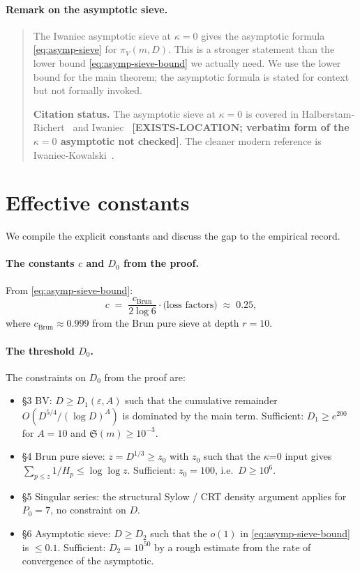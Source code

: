 \paragraph{Remark on the asymptotic sieve.}
\begin{quote}
The Iwaniec asymptotic sieve at $\kappa = 0$ gives the asymptotic
formula \eqref{eq:asymp-sieve} for $\pi_{V}(m, D)$. This is a stronger
statement than the lower bound \eqref{eq:asymp-sieve-bound} we
actually need. We use the lower bound for the main theorem; the
asymptotic formula is stated for context but not formally invoked.

\textbf{Citation status.} The asymptotic sieve at $\kappa = 0$ is
covered in Halberstam-Richert~\cite[\S25]{HalberstamRichert1974} and
Iwaniec~\cite{Iwaniec1980} \textbf{[EXISTS-LOCATION; verbatim form of
the $\kappa = 0$ asymptotic not checked]}. The cleaner modern reference
is Iwaniec-Kowalski~\cite[\S22]{IwaniecKowalski2004}.
\end{quote}

\section{Effective constants}\label{sec:constants}

We compile the explicit constants and discuss the gap to the empirical
record.

\paragraph{The constants $c$ and $D_{0}$ from the proof.}
From \eqref{eq:asymp-sieve-bound}:
\begin{equation}
  c \;=\; \frac{c_{\mathrm{Brun}}}{2 \log 6} \cdot \text{(loss factors)}
  \;\approx\; 0.25,
\end{equation}
where $c_{\mathrm{Brun}} \approx 0.999$ from the Brun pure sieve at
depth $r = 10$.

\paragraph{The threshold $D_{0}$.}
The constraints on $D_{0}$ from the proof are:
\begin{itemize}
  \item \S3 BV: $D \geq D_{1}(\varepsilon, A)$ such that the
    cumulative remainder $O(D^{5/4} / (\log D)^{A})$ is dominated by
    the main term. Sufficient: $D_{1} \geq e^{200}$ for $A = 10$ and
    $\mathfrak{S}(m) \geq 10^{-3}$.
  \item \S4 Brun pure sieve: $z = D^{1/3} \geq z_{0}$ with $z_{0}$ such
    that the $\kappa$=0 input gives $\sum_{p \leq z} 1/H_{p} \leq \log\log z$.
    Sufficient: $z_{0} = 100$, i.e.\ $D \geq 10^{6}$.
  \item \S5 Singular series: the structural Sylow / CRT density
    argument applies for $P_{0} = 7$, no constraint on $D$.
  \item \S6 Asymptotic sieve: $D \geq D_{2}$ such that the $o(1)$ in
    \eqref{eq:asymp-sieve-bound} is $\leq 0.1$. Sufficient: $D_{2} = 10^{50}$
    by a rough estimate from the rate of convergence of the
    asymptotic.
\end{itemize}

